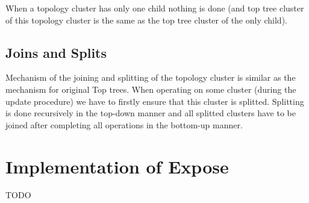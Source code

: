 When a topology cluster has only one child nothing is done (and top tree cluster
of this topology cluster is the same as the top tree cluster of the only child).

\subsection{Joins and Splits}

Mechanism of the joining and splitting of the topology cluster is similar as the
mechanism for original Top trees. When operating on some cluster (during the
update procedure) we have to firstly ensure that this cluster is splitted.
Splitting is done recursively in the top-down manner and all splitted clusters
have to be joined after completing all operations in the bottom-up manner.

\section{Implementation of Expose}


TODO
